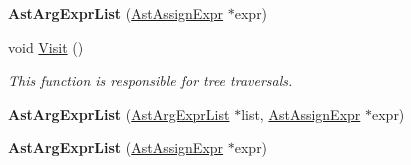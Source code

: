 \begin{DoxyCompactItemize}
\item 
\hypertarget{classAstArgExprList_a4acc4d03bbbe66b9a19e991d21169414}{{\bfseries Ast\-Arg\-Expr\-List} (\hyperlink{classAstAssignExpr}{Ast\-Assign\-Expr} $\ast$expr)}\label{classAstArgExprList_a4acc4d03bbbe66b9a19e991d21169414}

\item 
void \hyperlink{classAstArgExprList_aeac192a90197b0de59114cea84a1e577}{Visit} ()
\begin{DoxyCompactList}\small\item\em This function is responsible for tree traversals. \end{DoxyCompactList}\item 
\hypertarget{classAstArgExprList_a6aafae6eaadd5db52a33768136657610}{{\bfseries Ast\-Arg\-Expr\-List} (\hyperlink{classAstArgExprList}{Ast\-Arg\-Expr\-List} $\ast$list, \hyperlink{classAstAssignExpr}{Ast\-Assign\-Expr} $\ast$expr)}\label{classAstArgExprList_a6aafae6eaadd5db52a33768136657610}

\item 
\hypertarget{classAstArgExprList_a4acc4d03bbbe66b9a19e991d21169414}{{\bfseries Ast\-Arg\-Expr\-List} (\hyperlink{classAstAssignExpr}{Ast\-Assign\-Expr} $\ast$expr)}\label{classAstArgExprList_a4acc4d03bbbe66b9a19e991d21169414}


\end{DoxyCompactItemize}
